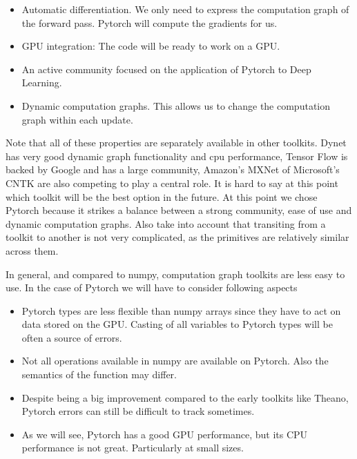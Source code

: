 \begin{itemize}
\item Automatic differentiation. We only need to express the computation graph of the forward pass. Pytorch will compute the gradients for us. 
\item GPU integration: The code will be ready to work on a GPU.
\item An active community focused on the application of Pytorch to Deep Learning.
\item Dynamic computation graphs. This allows us to change the computation graph within each update. 
\end{itemize}

Note that all of these properties are separately available in other toolkits. Dynet
has very good dynamic graph functionality and cpu performance, Tensor Flow is
backed by Google and has a large community, Amazon's MXNet of Microsoft's CNTK
are also competing to play a central role. It is hard to say at this point
which toolkit will be the best option in the future. At this point we chose Pytorch 
because it strikes a balance between a strong community, ease of use and
dynamic computation graphs. Also take into account that transiting from a
toolkit to another is not very complicated, as the primitives are relatively
similar across them.

In general, and compared to numpy, computation graph toolkits are less easy to use.
In the case of Pytorch we will have to consider following aspects 

\begin{itemize}
\item Pytorch types are less flexible than numpy arrays since they have to act on data stored on the GPU. Casting of all variables to Pytorch types will be often a source of errors.
\item Not all operations available in numpy are available on Pytorch. Also the semantics of the function may differ.
\item Despite being a big improvement compared to the early toolkits like Theano, Pytorch errors can still be difficult to track sometimes.
\item As we will see, Pytorch has a good GPU performance, but its CPU performance is not great. Particularly at small sizes. 
\end{itemize}



